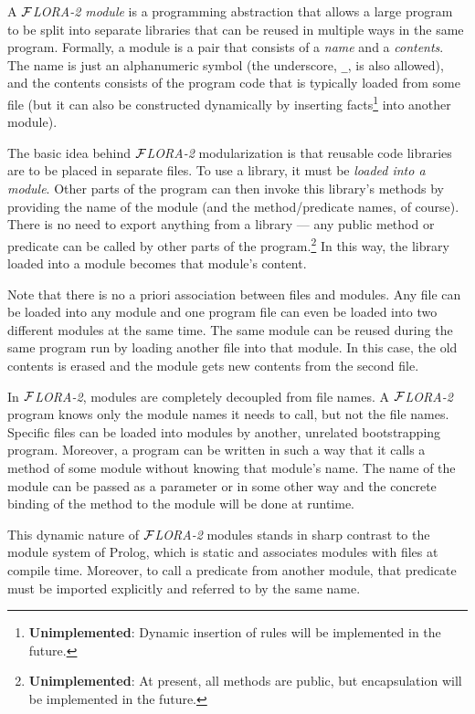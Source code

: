 \documentclass[11pt]{article}
\newcommand{\FLORA}{{\mbox{${\cal F}${\small\it LORA}\rm\emph{-2}}}\xspace}
\begin{document}
A \emph{\FLORA module} is a programming abstraction that allows a large
program to be split into separate libraries that can be reused in multiple
ways in the same program. Formally, a module is a pair that consists of a
\emph{name} and a \emph{contents}. The name is just an alphanumeric symbol
(the underscore, {\tt \_}, is also allowed), and the contents consists of
the program code that is typically loaded from some file (but it can also
be constructed dynamically by inserting facts\footnote{
  {\bf Unimplemented}: Dynamic insertion of rules will be implemented in
  the future.
  }
into another module).

The basic idea behind \FLORA modularization is that reusable code libraries
are to be placed in separate files.  To use a library, it must be
\emph{loaded into a module}. Other parts of the program can then invoke
this library's methods by providing the name of the module (and the
method/predicate names, of course).  There is no need to export anything
from a library --- any public method or predicate can be called by other
parts of the program.\footnote{
  {\bf Unimplemented}: At present, all methods are public, but
  encapsulation will be implemented in the future.
  }
In this way, the library loaded into a module becomes that module's content.

Note that there is no a priori association between files and modules.  Any
file can be loaded into any module and one program file can even be loaded
into two different modules at the same time. The same module can be reused
during the same program run by loading another file into that module. In
this case, the old contents is erased and the module gets new contents from
the second file.

In \FLORA, modules are completely decoupled from file names. A \FLORA
program knows only the module names it needs to call, but not the file
names. Specific files can be loaded into modules by another, unrelated
bootstrapping program. Moreover, a program can be written in such a way
that it calls a method of some module without knowing that module's name.
The name of the module can be passed as a parameter or in some other way
and the concrete binding of the method to the module will be done at
runtime.

This dynamic nature of \FLORA modules stands in sharp contrast to the module
system of Prolog, which is static and associates modules with files at compile
time. Moreover, to call a predicate from another module, that predicate
must be imported explicitly and referred to by the same name.
\end{document}
